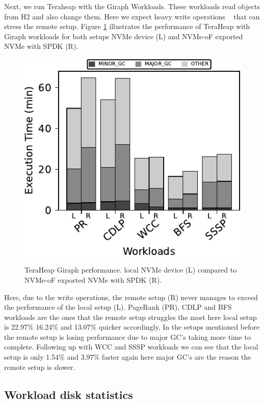 Next, we run Teraheap with the Giraph Workloads. These workloads read objects
from H2 and also change them. Here we expect heavy write operations
~\cite{giraph,teraheap} that can stress the remote setup. Figure
\ref{fig:bench_giraph} illustrates the performance of TeraHeap with Giraph
workloads for both setups NVMe device (L) and NVMe-oF exported NVMe with SPDK
(R).

\begin{figure}[H]
  \includegraphics[width=\linewidth]{figures/bench_giraph.pdf}\\
\caption{TeraHeap Giraph performance. local NVMe device (L) compared to NVMe-oF exported NVMe with SPDK (R).}
\label{fig:bench_giraph}
\end{figure}
Here, due to the write operations, the remote setup (R) never manages to exceed the performance of the local setup (L). PageRank (PR), CDLP and BFS workloads are the ones that the remote setup struggles the most here local setup is 22.97\% 16.24\% and 13.07\% quicker accordingly. In the setups mentioned before the remote setup is losing performance due to major GC's taking more time to complete. Following up with WCC and SSSP workloads we can see that the local setup is only 1.54\%	and 3.97\% faster again here major GC's are the reason the remote setup is slower.

\subsection{Workload disk statistics}

